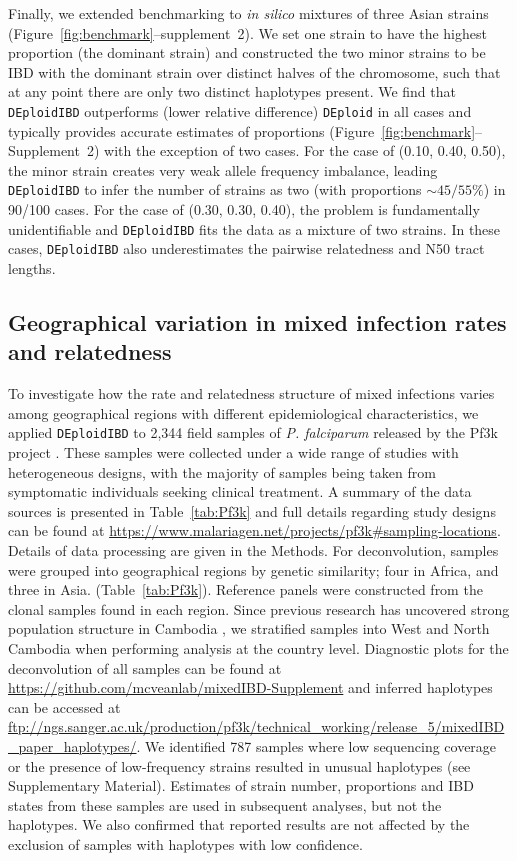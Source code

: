 \documentclass[9pt,lineno]{elife}
\begin{document}
Finally, we extended benchmarking to \emph{in silico} mixtures of three Asian strains  (Figure~\ref{fig:benchmark}--supplement~2). We set one strain to have the highest proportion (the dominant strain) and constructed the two minor strains to be IBD with the dominant strain over distinct halves of the chromosome, such that at any point there are only two distinct haplotypes present.  We find that \texttt{DEploidIBD} outperforms (lower relative difference) \texttt{DEploid} in all cases and typically provides accurate estimates of proportions (Figure~\ref{fig:benchmark}--Supplement~2) with the exception of two cases. For the case of (0.10, 0.40, 0.50), the minor strain creates very weak allele frequency imbalance, leading {\tt DEploidIBD} to infer the number of strains as two (with proportions $\sim 45/55\%$) in 90/100 cases. For the case of (0.30, 0.30, 0.40), the problem is fundamentally unidentifiable and \texttt{DEploidIBD} fits the data as a mixture of two strains.  In these cases, \texttt{DEploidIBD} also underestimates the pairwise relatedness and N50 tract lengths.


\subsection{Geographical variation in mixed infection rates and relatedness}

To investigate how the rate and relatedness structure of mixed infections varies among geographical regions with different epidemiological characteristics, we applied \texttt{DEploidIBD} to 2,344 field samples of {\it P. falciparum} released by the Pf3k project \citep{pf3k}.  These samples were collected under a wide range of studies with heterogeneous designs, with the majority of samples being taken from symptomatic individuals seeking clinical treatment. A summary of the data sources is presented in Table~\ref{tab:Pf3k} and full details regarding study designs can be found at \url{https://www.malariagen.net/projects/pf3k#sampling-locations}.  Details of data processing are given in the Methods. For deconvolution, samples were grouped into geographical regions by genetic similarity; four in Africa, and three in Asia. (Table~\ref{tab:Pf3k}). Reference panels were constructed from the clonal samples found in each region. Since previous research has uncovered strong population structure in Cambodia \citep{Miotto2013}, we stratified samples into West and North Cambodia when performing analysis at the country level. Diagnostic plots for the deconvolution of all samples can be found at \url{https://github.com/mcveanlab/mixedIBD-Supplement} and inferred haplotypes can be accessed at \url{ftp://ngs.sanger.ac.uk/production/pf3k/technical_working/release_5/mixedIBD_paper_haplotypes/}.  We identified 787 samples where low sequencing coverage or the presence of low-frequency strains resulted in unusual haplotypes (see Supplementary Material).  Estimates of strain number, proportions and IBD states from these samples are used in subsequent analyses, but not the haplotypes.  We also confirmed that reported results are not affected by the exclusion of samples with haplotypes with low confidence.
\end{document}
